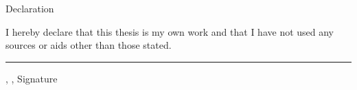 \thispagestyle{empty}

\vspace*{-15.8mm}
\fontsize{19pt}{21pt}\selectfont
\ErklaerungUeberschrift

\vspace{25.3mm}
Declaration

\normalsize\selectfont
\vspace{13.2mm}
I hereby declare that this thesis is my own work and that I have not used
any sources or aids other than those stated.

\vspace{18.1mm}
\rule[-3.7mm]{\linewidth}{0.5pt}
\Ort{}, \Datum{}, Signature

\newpage

\restoregeometry
\textblockorigin{\SeitenrandLinks}{\SeitenrandOben}
